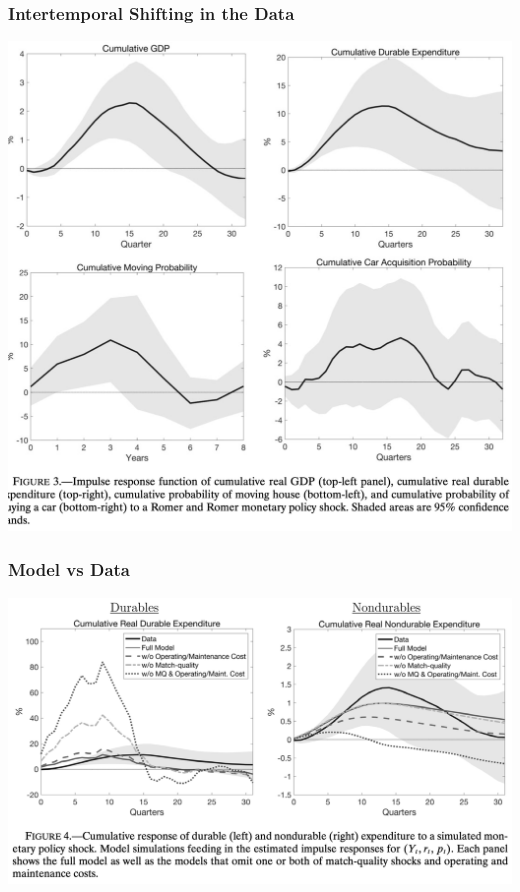 \documentclass[english,xcolor=svgnames]{beamer}
\begin{document}
\begin{frame}
    \frametitle{Intertemporal Shifting in the Data}
    \begin{center}
    	\includegraphics[scale=0.2]{figures/MWFIG3.png}	
    \end{center}
\end{frame}

\begin{frame}
    \frametitle{Model vs Data}
    \begin{center}
    	\includegraphics[scale=0.3]{figures/MWFIG4.png}	
    \end{center}
\end{frame}
\end{document}
